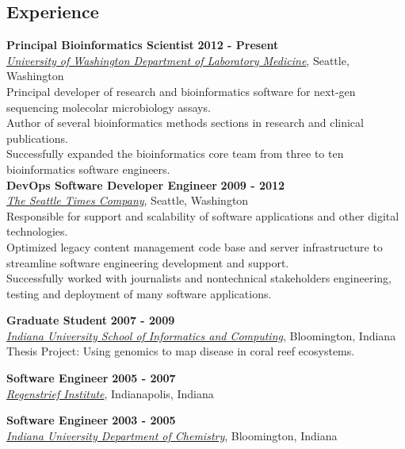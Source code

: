 \documentclass{res}
\begin{document}

\address{Seattle, WA}
\address{crosenth@gmail.com}

\begin{resume}

\section{Experience}

\textbf{Principal Bioinformatics Scientist} \hfill \textbf{2012 - Present}\\
\href{http://depts.washington.edu/labweb/}{\textit{University of Washington Department of Laboratory Medicine}},
Seattle, Washington\\
 Principal developer of research and bioinformatics software for next-gen sequencing molecolar microbiology assays.\\
 Author of several bioinformatics methods sections in research and clinical publications.\\
 Successfully expanded the bioinformatics core team from three to ten bioinformatics software engineers.\\

\textbf{DevOps Software Developer Engineer} \hfill \textbf{2009 - 2012}\\
\href{http://www.seattletimes.com/}{\textit{The Seattle Times Company}}, Seattle, Washington\\
 Responsible for support and scalability of software applications and other digital technologies.\\
 Optimized legacy content management code base and server infrastructure to streamline software engineering development and support.\\
 Successfully worked with journalists and nontechnical stakeholders engineering, testing and deployment of many software applications.

\textbf{Graduate Student} \hfill \textbf{2007 - 2009}\\
\href{https://www.soic.indiana.edu/}{\textit{Indiana University School of Informatics and Computing}}, Bloomington, Indiana\\
Thesis Project: Using genomics to map disease in coral reef ecosystems.

\textbf{Software Engineer} \hfill \textbf{2005 - 2007}\\
\href{http://www.regenstrief.org/}{\textit{Regenstrief Institute}}, Indianapolis, Indiana

\textbf{Software Engineer} \hfill \textbf{2003 - 2005}\\
\href{http://chem.indiana.edu/}{\textit{Indiana University Department of Chemistry}}, Bloomington, Indiana


\end{resume}
\end{document}
